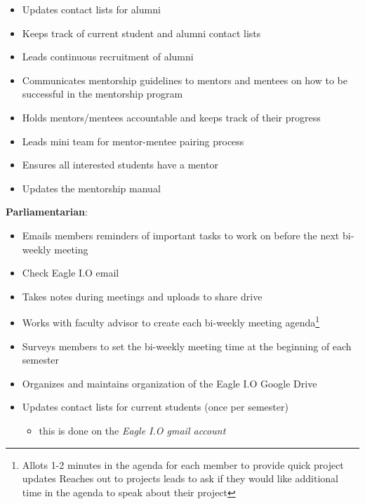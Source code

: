 \documentclass[
]{book}
\providecommand{\tightlist}{%
  \setlength{\itemsep}{0pt}\setlength{\parskip}{0pt}}
\begin{document}
\begin{itemize}
\tightlist
\item
  Updates contact lists for alumni
\item
  Keeps track of current student and alumni contact lists\\
\item
  Leads continuous recruitment of alumni\\
\item
  Communicates mentorship guidelines to mentors and mentees on how to be successful in the mentorship program\\
\item
  Holds mentors/mentees accountable and keeps track of their progress\\
\item
  Leads mini team for mentor-mentee pairing process\\
\item
  Ensures all interested students have a mentor
\item
  Updates the mentorship manual
\end{itemize}

\textbf{Parliamentarian}:

\begin{itemize}
\tightlist
\item
  Emails members reminders of important tasks to work on before the next bi-weekly meeting
\item
  Check Eagle I.O email
\item
  Takes notes during meetings and uploads to share drive\\
\item
  Works with faculty advisor to create each bi-weekly meeting agenda\footnote{Allots 1-2 minutes in the agenda for each member to provide quick project updates Reaches out to projects leads to ask if they would like additional time in the agenda to speak about their project}
\item
  Surveys members to set the bi-weekly meeting time at the beginning of each semester
\item
  Organizes and maintains organization of the Eagle I.O Google Drive
\item
  Updates contact lists for current students (once per semester)

  \begin{itemize}
  \tightlist
  \item
    this is done on the \emph{Eagle I.O gmail account}
  \end{itemize}
\end{itemize}
\end{document}
